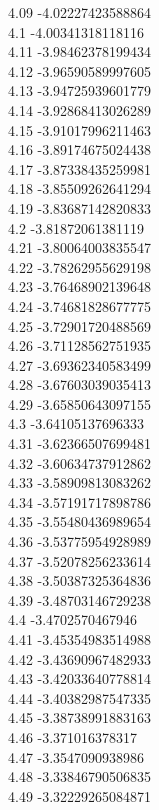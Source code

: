 {4.09	-4.02227423588864\\
4.1	-4.00341318118116\\
4.11	-3.98462378199434\\
4.12	-3.96590589997605\\
4.13	-3.94725939601779\\
4.14	-3.92868413026289\\
4.15	-3.91017996211463\\
4.16	-3.89174675024438\\
4.17	-3.87338435259981\\
4.18	-3.85509262641294\\
4.19	-3.83687142820833\\
4.2	-3.81872061381119\\
4.21	-3.80064003835547\\
4.22	-3.78262955629198\\
4.23	-3.76468902139648\\
4.24	-3.74681828677775\\
4.25	-3.72901720488569\\
4.26	-3.71128562751935\\
4.27	-3.69362340583499\\
4.28	-3.67603039035413\\
4.29	-3.65850643097155\\
4.3	-3.64105137696333\\
4.31	-3.62366507699481\\
4.32	-3.60634737912862\\
4.33	-3.58909813083262\\
4.34	-3.57191717898786\\
4.35	-3.55480436989654\\
4.36	-3.53775954928989\\
4.37	-3.52078256233614\\
4.38	-3.50387325364836\\
4.39	-3.48703146729238\\
4.4	-3.4702570467946\\
4.41	-3.45354983514988\\
4.42	-3.43690967482933\\
4.43	-3.42033640778814\\
4.44	-3.40382987547335\\
4.45	-3.38738991883163\\
4.46	-3.371016378317\\
4.47	-3.3547090938986\\
4.48	-3.33846790506835\\
4.49	-3.32229265084871\\
}
